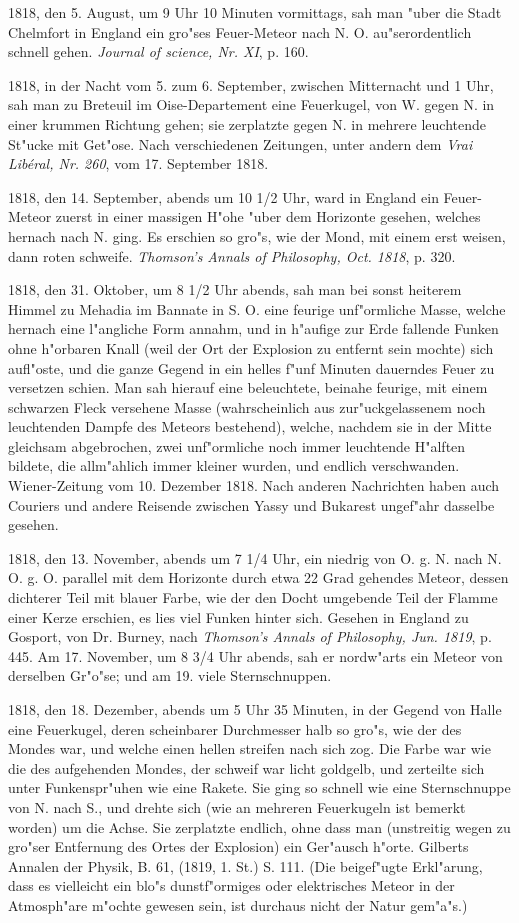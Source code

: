 \documentclass[a4paper, 11pt, oneside, polutonikogreek, german]{article}
\begin{document}
1818, den 5. August, um 9 Uhr 10 Minuten vormittags, sah man "uber die Stadt Chelmfort in England ein gro"ses Feuer-Meteor nach N. O. au"serordentlich schnell gehen. \emph{Journal of science, Nr. XI}, p. 160.

1818, in der Nacht vom 5. zum 6. September, zwischen Mitternacht und 1 Uhr, sah man zu Breteuil im Oise-Departement eine Feuerkugel, von W. gegen N. in einer krummen Richtung gehen; sie zerplatzte gegen N. in mehrere leuchtende St"ucke mit Get"ose. Nach verschiedenen Zeitungen, unter andern dem \emph{Vrai Libéral, Nr. 260}, vom 17. September 1818.

1818, den 14. September, abends um 10 1/2 Uhr, ward in England ein Feuer-Meteor zuerst in einer massigen H"ohe "uber dem Horizonte gesehen, welches hernach nach N. ging. Es erschien so gro"s, wie der Mond, mit einem erst weisen, dann roten schweife. \emph{Thomson's Annals of Philosophy, Oct. 1818}, p. 320.

1818, den 31. Oktober, um 8 1/2 Uhr abends, sah man bei sonst heiterem Himmel zu Mehadia im Bannate in S. O. eine feurige unf"ormliche Masse, welche hernach eine l"angliche Form annahm, und in h"aufige zur Erde fallende Funken ohne h"orbaren Knall (weil der Ort der Explosion zu entfernt sein mochte) sich aufl"oste, und die ganze Gegend in ein helles f"unf Minuten dauerndes Feuer zu versetzen schien. Man sah hierauf eine beleuchtete, beinahe feurige, mit einem schwarzen Fleck versehene Masse (wahrscheinlich aus zur"uckgelassenem noch leuchtenden Dampfe des Meteors bestehend), welche, nachdem sie in der Mitte gleichsam abgebrochen, zwei unf"ormliche noch immer leuchtende H"alften bildete, die allm"ahlich immer kleiner wurden, und endlich verschwanden. Wiener-Zeitung vom 10. Dezember 1818. Nach anderen Nachrichten haben auch Couriers und andere Reisende zwischen Yassy und Bukarest ungef"ahr dasselbe gesehen.

1818, den 13. November, abends um 7 1/4 Uhr, ein niedrig von O. g. N. nach N. O. g. O. parallel mit dem Horizonte durch etwa 22 Grad gehendes Meteor, dessen dichterer Teil mit blauer Farbe, wie der den Docht umgebende Teil der Flamme einer Kerze erschien, es lies viel Funken hinter sich. Gesehen in England zu Gosport, von Dr. Burney, nach \emph{Thomson's Annals of Philosophy, Jun. 1819}, p. 445. Am 17. November, um 8 3/4 Uhr abends, sah er nordw"arts ein Meteor von derselben Gr"o"se; und am 19. viele Sternschnuppen.

1818, den 18. Dezember, abends um 5 Uhr 35 Minuten, in der Gegend von Halle eine Feuerkugel, deren scheinbarer Durchmesser halb so gro"s, wie der des Mondes war, und welche einen hellen streifen nach sich zog. Die Farbe war wie die des aufgehenden Mondes, der schweif war licht goldgelb, und zerteilte sich unter Funkenspr"uhen wie eine Rakete. Sie ging so schnell wie eine Sternschnuppe von N. nach S., und drehte sich (wie an mehreren Feuerkugeln ist bemerkt worden) um die Achse. Sie zerplatzte endlich, ohne dass man (unstreitig wegen zu gro"ser Entfernung des Ortes der Explosion) ein Ger"ausch h"orte. Gilberts Annalen der Physik, B. 61, (1819, 1. St.) S. 111. (Die beigef"ugte Erkl"arung, dass es vielleicht ein blo"s dunstf"ormiges oder elektrisches Meteor in der Atmosph"are m"ochte gewesen sein, ist durchaus nicht der Natur gem"a"s.)
\end{document}
